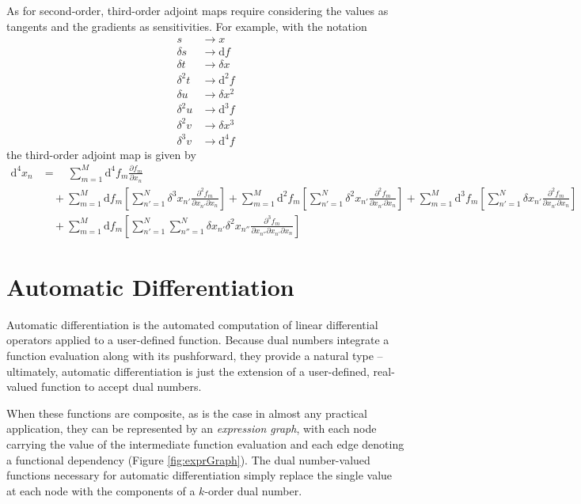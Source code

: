 As for second-order, third-order adjoint maps require considering the values as tangents
and the gradients as sensitivities.  For example, with the notation
%
\begin{align*}
s &\rightarrow x \\
\delta s &\rightarrow \mathrm{d} f \\
\delta t &\rightarrow \delta x \\
\delta^{2} t &\rightarrow \mathrm{d}^{2} f \\
\delta u &\rightarrow \delta x^{2} \\
\delta^{2} u &\rightarrow \mathrm{d}^{3} f \\
\delta^{2} v &\rightarrow \delta x^{3} \\
\delta^{3} v &\rightarrow \mathrm{d}^{4} f
\end{align*}
%
the third-order adjoint map is given by
%
\begin{align*}
\mathrm{d}^{4} x_{n}
&= \quad
\sum_{m = 1}^{M} \mathrm{d}^{4} f_{m} \frac{ \partial f_{m} }{ \partial x_{n} }
\\
& \quad + 
\sum_{m = 1}^{M} \mathrm{d} f_{m}
\left[ \sum_{n'=1}^{N} \delta^{3} x_{n'} \frac{ \partial^{2} f_{m} }{ \partial x_{n'} \partial x_{n} } \right]
+
\sum_{m = 1}^{M} \mathrm{d}^{2} f_{m}
\left[ \sum_{n'=1}^{N} \delta^{2} x_{n'} \frac{ \partial^{2} f_{m} }{ \partial x_{n'} \partial x_{n} } \right]
+
\sum_{m = 1}^{M} \mathrm{d}^{3} f_{m}
\left[ \sum_{n'=1}^{N} \delta x_{n'} \frac{ \partial^{2} f_{m} }{ \partial x_{n'} \partial x_{n} } \right]
\\
& \quad +
\sum_{m = 1}^{M} \mathrm{d} f_{m}
\left[ \sum_{n'=1}^{N} \sum_{n''=1}^{N} \delta x_{n'} \delta^{2} x_{n''} 
\frac{ \partial^{3} f_{m} }{ \partial x_{n''} \partial x_{n'} \partial x_{n} } \right]
\end{align*}

\section{Automatic Differentiation}

Automatic differentiation is the automated computation of linear differential operators applied
to a user-defined function.  Because dual numbers integrate a function evaluation along with
its pushforward, they provide a natural type -- ultimately, automatic differentiation is just the
extension of a user-defined, real-valued function to accept dual numbers.

When these functions are composite, as is the case in almost any practical application, they
can be represented by an \textit{expression graph}, with each node carrying the value of
the intermediate function evaluation and each edge denoting a functional dependency
(Figure \ref{fig:exprGraph}).  The dual number-valued functions necessary for automatic
differentiation simply replace the single value at each node with the components of a
$k$-order dual number.

